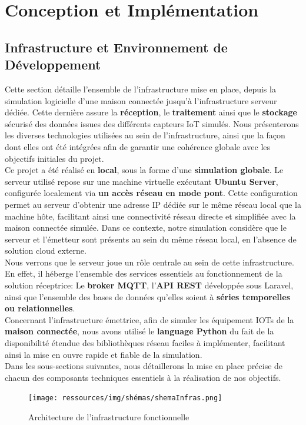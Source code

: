 \documentclass[10pt, a4paper]{report}
\begin{document}
	
	\chapter{Conception et Implémentation}
	
	\section{Infrastructure et Environnement de Développement}
	Cette section détaille l'ensemble de l’infrastructure mise en place, depuis la simulation logicielle d'une maison connectée jusqu'à l'infrastructure serveur dédiée. Cette dernière assure la \textbf{réception}, le \textbf{traitement} ainsi que le \textbf{stockage} sécurisé des données issues des différents capteurs IoT simulés. Nous présenterons les diverses technologies utilisées au sein de l'infrastructure, ainsi que la façon dont elles ont été intégrées afin de garantir une cohérence globale avec les objectifs initiales du projet.\\
	Ce projet a été réalisé en \textbf{local}, sous la forme d'une \textbf{simulation globale}. Le serveur utilisé repose sur une machine virtuelle exécutant \textbf{Ubuntu Server}, configurée localement via \textbf{un accès réseau en mode pont}. Cette configuration permet au serveur d'obtenir une adresse IP dédiée sur le même réseau local que la machine hôte, facilitant ainsi une connectivité réseau directe et simplifiée avec la maison connectée simulée. Dans ce contexte, notre simulation considère que le serveur et l’émetteur sont présents au sein du même réseau local, en l'absence de solution cloud externe.\\
	Nous verrons que le serveur joue un rôle centrale au sein de cette infrastructure. En effet, il héberge l'ensemble des services essentiels au fonctionnement de la solution réceptrice: Le \textbf{broker MQTT}, l'\textbf{API REST} développée sous Laravel, ainsi que l'ensemble des bases de données qu'elles soient à\textbf{ séries temporelles ou relationnelles}.\\
	Concernant l'infrastructure émettrice, afin de simuler les équipement IOTs de la \textbf{maison connectée}, nous avons utilisé le\textbf{ language Python} du fait de la disponibilité étendue des bibliothèques réseau faciles à implémenter, facilitant ainsi la mise en ouvre rapide et fiable de la simulation. \\
	Dans les sous-sections suivantes, nous détaillerons la mise en place précise de chacun des composants techniques essentiels à la réalisation de nos objectifs.
		\begin{figure}[h!]
		\centering
		\texttt{[image: ressources/img/shémas/shemaInfras.png]}
		\caption{Architecture de l'infrastructure fonctionnelle}
		\label{fig:archiInfra}
	\end{figure}
	
\end{document}
